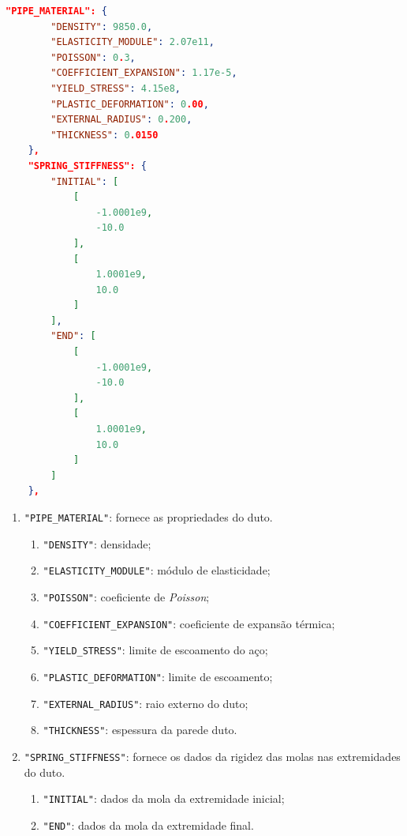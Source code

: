 \begin{lstlisting}[firstnumber=70, language=json, label={tab:jdsn-arquivojson3}, caption={Exemplo de arquivo de entrada de dados - Parte 3/7}]
    "PIPE_MATERIAL": {
        "DENSITY": 9850.0,
        "ELASTICITY_MODULE": 2.07e11,
        "POISSON": 0.3,
        "COEFFICIENT_EXPANSION": 1.17e-5,
        "YIELD_STRESS": 4.15e8,
        "PLASTIC_DEFORMATION": 0.00,
        "EXTERNAL_RADIUS": 0.200,
        "THICKNESS": 0.0150
    },
    "SPRING_STIFFNESS": {
        "INITIAL": [
            [
                -1.0001e9,
                -10.0
            ],
            [
                1.0001e9,
                10.0
            ]
        ],
        "END": [
            [
                -1.0001e9,
                -10.0
            ],
            [
                1.0001e9,
                10.0
            ]
        ]
    },
\end{lstlisting}

\begin{enumerate}
    \item \texttt{"PIPE\_MATERIAL"}: fornece as propriedades do duto.
    \begin{enumerate}
        \item \texttt{"DENSITY"}: densidade;
        \item \texttt{"ELASTICITY\_MODULE"}: módulo de elasticidade;
        \item \texttt{"POISSON"}: coeficiente de \textit{Poisson};
        \item \texttt{"COEFFICIENT\_EXPANSION"}: coeficiente de expansão térmica;
        \item \texttt{"YIELD\_STRESS"}: limite de escoamento do aço;
        \item \texttt{"PLASTIC\_DEFORMATION"}: limite de escoamento;
        \item \texttt{"EXTERNAL\_RADIUS"}: raio externo do duto;
        \item \texttt{"THICKNESS"}: espessura da parede duto.
    \end{enumerate}
    \item \texttt{"SPRING\_STIFFNESS"}: fornece os dados da rigidez das molas nas extremidades do duto.
    \begin{enumerate}
        \item \texttt{"INITIAL"}: dados da mola da extremidade inicial;
        \item \texttt{"END"}: dados da mola da extremidade final.
    \end{enumerate}
\end{enumerate}

